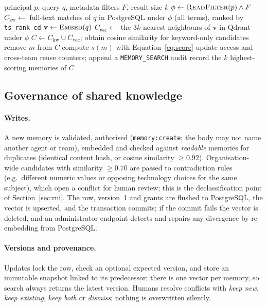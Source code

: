 \documentclass[11pt,a4paper]{article}
\theoremstyle{remark}
\begin{document}
\begin{algorithm}[htbp]
\caption{Permission-aware hybrid search ($F_{\mathrm{pre}}$ with document-local scores)}
\label{alg:search}
\begin{algorithmic}[1]
\Require principal $p$, query $q$, metadata filters $F$, result size $k$
\State $\phi \gets \textsc{ReadFilter}(p) \land F$ 
\State $C_{\mathrm{kw}} \gets$ full-text matches of $q$ in PostgreSQL under $\phi$ (all terms), ranked by \texttt{ts\_rank\_cd}
\State $\mathbf{v} \gets \textsc{Embed}(q)$
\State $C_{\mathrm{vec}} \gets$ the $3k$ nearest neighbours of $\mathbf{v}$ in Qdrant under $\phi$
\State $C \gets C_{\mathrm{kw}} \cup C_{\mathrm{vec}}$; obtain cosine similarity for keyword-only candidates
    \State remove $m$ from $C$ 
  \EndIf
  \State compute $s(m)$ with Equation~\eqref{eq:score}
\EndFor
\State update access and cross-team reuse counters; append a \texttt{MEMORY\_SEARCH} audit record
\State \Return the $k$ highest-scoring memories of $C$
\end{algorithmic}
\end{algorithm}

\subsection{Governance of shared knowledge}
\label{sec:lifecycle}

\paragraph{Writes.} A new memory is validated, authorised (\texttt{memory:create}; the body may not name another
agent or team), embedded and checked against \emph{readable} memories for duplicates (identical content hash, or
cosine similarity $\geq 0.92$). Organisation-wide candidates with similarity $\geq 0.70$ are passed to contradiction
rules (e.g.\ different numeric values or opposing technology choices for the same subject), which open a conflict
for human review; this is the declassification point of Section~\ref{sec:rni}. The row, version~1 and grants are
flushed to PostgreSQL, the vector is upserted, and the transaction commits; if the commit fails the vector is
deleted, and an administrator endpoint detects and repairs any divergence by re-embedding from PostgreSQL.

\paragraph{Versions and provenance.} Updates lock the row, check an optional expected version, and store an
immutable snapshot linked to its predecessor; there is one vector per memory, so search always returns the latest
version. Humans resolve conflicts with \emph{keep new}, \emph{keep existing}, \emph{keep both} or \emph{dismiss};
nothing is overwritten silently.
\end{document}
